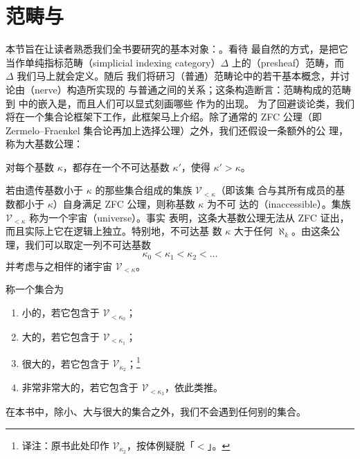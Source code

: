 \section{范畴与\trSimplicialSet{}}
\label{sec:categories-and-simplicial-sets}

本节旨在让读者熟悉我们全书要研究的基本对象：\trSimplicialSet{}。看待%
\trSimplicialSet{}最自然的方式，是把它当作单纯指标范畴（simplicial indexing
category）$\Delta$ 上的\trPresheaf{}（presheaf）范畴，而 $\Delta$ 我们马上就会定义。随后
我们将研习（普通）范畴论中的若干基本概念，并讨论由\trNerve{}（nerve）构造所实现的%
\trSimplicialSet{}与普通\trCategory{}之间的关系；这条构造断言：范畴构成的范畴到%
\trSimplicialSet{}中的嵌入是\trFullyFaithful{}，而且人们可以显式刻画哪些%
\trSimplicialSet{}作为\trCategory{}的\trNerve{}出现。
为了回避谈论类，我们将在一个集合论框架下工作，此框架马上介绍。除了通常的 ZFC
公理（即 Zermelo--Fraenkel 集合论再加上选择公理）之外，我们还假设一条额外的公
理，称为大基数公理：

\begin{axiom*}
对每个基数 $\kappa$，都存在一个不可达基数 $\kappa'$，使得
$\kappa' > \kappa$。
\end{axiom*}

若由遗传基数小于 $\kappa$ 的那些集合组成的集族 $\mathcal{V}_{<\kappa}$（即该集
合与其所有成员的基数都小于 $\kappa$）自身满足 ZFC 公理，则称基数 $\kappa$ 为不可
达的（inaccessible）。集族 $\mathcal{V}_{<\kappa}$ 称为一个宇宙（universe）。事实
表明，这条大基数公理无法从 ZFC 证出，而且实际上它在逻辑上独立。特别地，不可达基
数 $\kappa$ 大于任何 $\aleph_k$。由这条公理，我们可以取定一列不可达基数
\[
\kappa_0 < \kappa_1 < \kappa_2 < \dots
\]
并考虑与之相伴的诸宇宙 $\mathcal{V}_{<\kappa}$。

\begin{definition}\label{def:small-large-very-large-sets}
称一个集合为
\begin{enumerate}[label=(\arabic*)]
  \item 小的，若它包含于 $\mathcal{V}_{<\kappa_0}$；
  \item 大的，若它包含于 $\mathcal{V}_{<\kappa_1}$；
  \item 很大的，若它包含于 $\mathcal{V}_{\kappa_2}$；\footnote{译注：原书此处印作
  $\mathcal{V}_{\kappa_2}$，按体例疑脱「$<$」。}
  \item 非常非常大的，若它包含于 $\mathcal{V}_{<\kappa_3}$，依此类推。
\end{enumerate}
在本书中，除小、大与很大的集合之外，我们不会遇到任何别的集合。
\end{definition}

